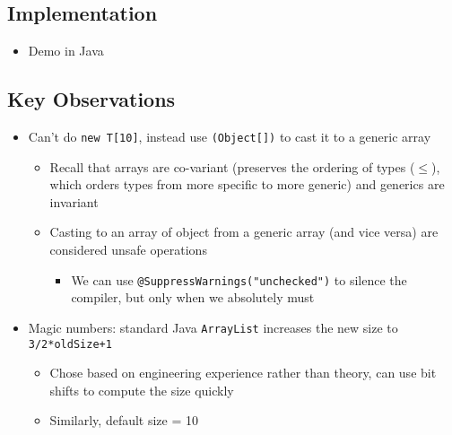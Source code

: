 \documentclass[10pt]{article}
\begin{document}
\subsection*{Implementation}
\begin{itemize}
    \item Demo in Java
\end{itemize}

\subsection*{Key Observations}
\begin{itemize}
    \item Can't do \texttt{new T[10]}, instead use \texttt{(Object[])} to cast it to a generic array
    \begin{itemize}
        \item Recall that arrays are co-variant (preserves the ordering of types ($\leq$), which orders types from more specific to more generic) and generics are invariant
        \item Casting to an array of object from a generic array (and vice versa) are considered unsafe operations
        \begin{itemize}
            \item We can use \texttt{@SuppressWarnings("unchecked")} to silence the compiler, but only when we absolutely must
        \end{itemize}
    \end{itemize}
    \item Magic numbers: standard Java \texttt{ArrayList} increases the new size to \texttt{3/2*oldSize+1}
    \begin{itemize}
        \item Chose based on engineering experience rather than theory, can use bit shifts to compute the size quickly
        \item Similarly, default size = 10
    \end{itemize}
\end{itemize}
\end{document}
